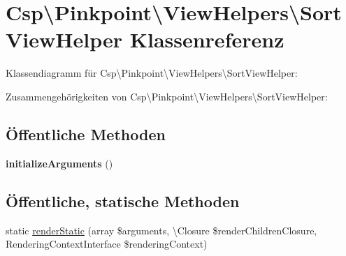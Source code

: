 \hypertarget{classCsp_1_1Pinkpoint_1_1ViewHelpers_1_1SortViewHelper}{}\section{Csp\textbackslash{}Pinkpoint\textbackslash{}View\+Helpers\textbackslash{}Sort\+View\+Helper Klassenreferenz}
\label{classCsp_1_1Pinkpoint_1_1ViewHelpers_1_1SortViewHelper}


Klassendiagramm für Csp\textbackslash{}Pinkpoint\textbackslash{}View\+Helpers\textbackslash{}Sort\+View\+Helper\+:


Zusammengehörigkeiten von Csp\textbackslash{}Pinkpoint\textbackslash{}View\+Helpers\textbackslash{}Sort\+View\+Helper\+:
\subsection*{Öffentliche Methoden}
\begin{DoxyCompactItemize}
\item 
\mbox{\label{classCsp_1_1Pinkpoint_1_1ViewHelpers_1_1SortViewHelper_a235224d91ebaa83fbae4f78c1c219023}} 
{\bfseries initialize\+Arguments} ()
\end{DoxyCompactItemize}
\subsection*{Öffentliche, statische Methoden}
\begin{DoxyCompactItemize}
\item 
static \hyperlink{classCsp_1_1Pinkpoint_1_1ViewHelpers_1_1SortViewHelper_ad3fafc1688abf324fde3a39395c62831}{render\+Static} (array \$arguments, \textbackslash{}Closure \$render\+Children\+Closure, Rendering\+Context\+Interface \$rendering\+Context)
\end{DoxyCompactItemize}
